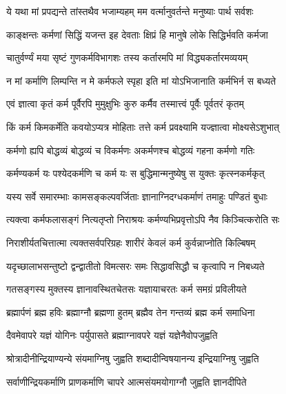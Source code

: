 \twolineshloka
{ये यथा मां प्रपद्यन्ते तांस्तथैव भजाम्यहम्}
{मम वर्त्मानुवर्तन्ते मनुष्याः पार्थ सर्वशः}%

\twolineshloka
{काङ्क्षन्तः कर्मणां सिद्धिं यजन्त इह देवताः}
{क्षिप्रं हि मानुषे लोके सिद्धिर्भवति कर्मजा}%

\twolineshloka
{चातुर्वर्ण्यं मया सृष्टं गुणकर्मविभागशः}
{तस्य कर्तारमपि मां विद्ध्यकर्तारमव्ययम्}%

\twolineshloka
{न मां कर्माणि लिम्पन्ति न मे कर्मफले स्पृहा}
{इति मां योऽभिजानाति कर्मभिर्न स बध्यते}%

\twolineshloka
{एवं ज्ञात्वा कृतं कर्म पूर्वैरपि मुमुक्षुभिः}
{कुरु कर्मैव तस्मात्त्वं पूर्वैः पूर्वतरं कृतम्}%

\twolineshloka
{किं कर्म किमकर्मेति कवयोऽप्यत्र मोहिताः}
{तत्ते कर्म प्रवक्ष्यामि यज्ज्ञात्वा मोक्ष्यसेऽशुभात्}%

\twolineshloka
{कर्मणो ह्यपि बोद्धव्यं बोद्धव्यं च विकर्मणः}
{अकर्मणश्च बोद्धव्यं गहना कर्मणो गतिः}%

\twolineshloka
{कर्मण्यकर्म यः पश्येदकर्मणि च कर्म यः}
{स बुद्धिमान्मनुष्येषु स युक्तः कृत्स्नकर्मकृत्}%

\twolineshloka
{यस्य सर्वे समारम्भाः कामसङ्कल्पवर्जिताः}
{ज्ञानाग्निदग्धकर्माणं तमाहुः पण्डितं बुधाः}%

\twolineshloka
{त्यक्त्वा कर्मफलासङ्गं नित्यतृप्तो निराश्रयः}
{कर्मण्यभिप्रवृत्तोऽपि नैव किञ्चित्करोति सः}%

\twolineshloka
{निराशीर्यतचित्तात्मा त्यक्तसर्वपरिग्रहः}
{शारीरं केवलं कर्म कुर्वन्नाप्नोति किल्बिषम्}%

\twolineshloka
{यदृच्छालाभसन्तुष्टो द्वन्द्वातीतो विमत्सरः}
{समः सिद्धावसिद्धौ च कृत्वापि न निबध्यते}%

\twolineshloka
{गतसङ्गस्य मुक्तस्य ज्ञानावस्थितचेतसः}
{यज्ञायाचरतः कर्म समग्रं प्रविलीयते}%

\twolineshloka
{ब्रह्मार्पणं ब्रह्म हविः ब्रह्माग्नौ ब्रह्मणा हुतम्}
{ब्रह्मैव तेन गन्तव्यं ब्रह्म कर्म समाधिना}%

\twolineshloka
{दैवमेवापरे यज्ञं योगिनः पर्युपासते}
{ब्रह्माग्नावपरे यज्ञं यज्ञेनैवोपजुह्वति}%

\twolineshloka
{श्रोत्रादीनीन्द्रियाण्यन्ये संयमाग्निषु जुह्वति}
{शब्दादीन्विषयानन्य इन्द्रियाग्निषु जुह्वति}%

\twolineshloka
{सर्वाणीन्द्रियकर्माणि प्राणकर्माणि चापरे}
{आत्मसंयमयोगाग्नौ जुह्वति ज्ञानदीपिते}%

